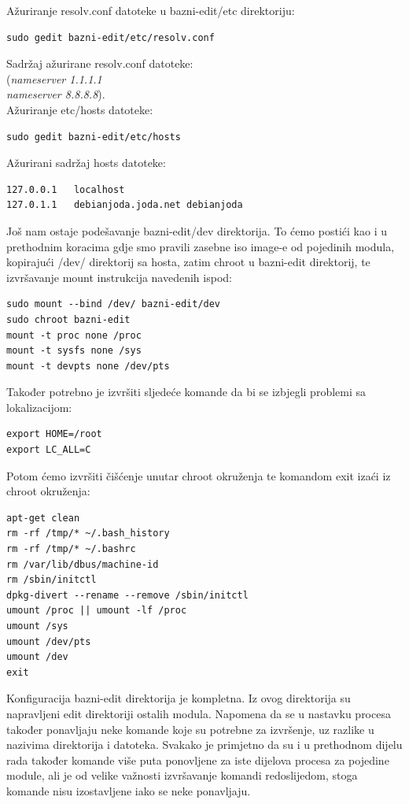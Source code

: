 \documentclass[12pt,vi]{mitthesis}
\begin{document}
Ažuriranje resolv.conf datoteke u bazni-edit/etc direktoriju:
\begin{lstlisting}[style=BashInputStyle]
sudo gedit bazni-edit/etc/resolv.conf
\end{lstlisting}
\noindent
Sadržaj ažurirane resolv.conf datoteke:\\
(\textit{nameserver 1.1.1.1 \\
nameserver 8.8.8.8}).\\
\noindent
Ažuriranje etc/hosts datoteke:
\begin{lstlisting}[style=BashInputStyle]
sudo gedit bazni-edit/etc/hosts
\end{lstlisting}
Ažurirani sadržaj hosts datoteke:
\begin{lstlisting}
127.0.0.1	localhost
127.0.1.1	debianjoda.joda.net	debianjoda
\end{lstlisting}

\noindent
Još nam ostaje podešavanje bazni-edit/dev direktorija. To ćemo postići kao i u prethodnim koracima gdje smo pravili zasebne iso image-e od pojedinih modula, kopirajući /dev/ direktorij sa hosta, zatim chroot u bazni-edit direktorij, te izvršavanje mount instrukcija navedenih ispod:
\begin{lstlisting}[style=BashInputStyle]
sudo mount --bind /dev/ bazni-edit/dev
sudo chroot bazni-edit
mount -t proc none /proc
mount -t sysfs none /sys
mount -t devpts none /dev/pts
\end{lstlisting}

\noindent
Također potrebno je izvršiti sljedeće komande da bi se izbjegli problemi sa lokalizacijom:
\begin{lstlisting}[style=BashInputStyle]
export HOME=/root
export LC_ALL=C
\end{lstlisting}

Potom ćemo izvršiti čišćenje unutar chroot okruženja te komandom exit izaći iz chroot okruženja:
\begin{lstlisting}[style=BashInputStyle]
apt-get clean
rm -rf /tmp/* ~/.bash_history
rm -rf /tmp/* ~/.bashrc
rm /var/lib/dbus/machine-id
rm /sbin/initctl
dpkg-divert --rename --remove /sbin/initctl
umount /proc || umount -lf /proc
umount /sys
umount /dev/pts
umount /dev
exit
\end{lstlisting}
\indent
Konfiguracija bazni-edit direktorija je kompletna. Iz ovog direktorija su napravljeni edit direktoriji ostalih modula. Napomena da se u nastavku procesa također ponavljaju neke komande koje su potrebne za izvršenje, uz razlike u nazivima direktorija i datoteka. Svakako je primjetno da su i u prethodnom dijelu rada također komande više puta ponovljene za iste dijelova procesa za pojedine module, ali je od velike važnosti izvršavanje komandi redoslijedom, stoga komande nisu izostavljene iako se neke ponavljaju.
\end{document}
